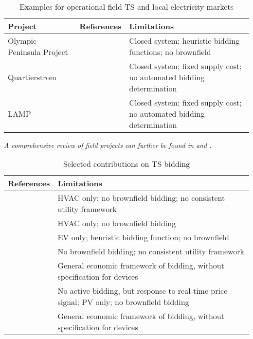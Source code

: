 \begin{table}[t]
\centering
\caption{Examples for operational field TS and local electricity markets}
\label{tab:existing_contributions}
\begin{tabular}{p{4cm}|p{5cm}|p{5cm}}
\textbf{Project} & \textbf{References} & \textbf{Limitations}                   \\ \hline
 Olympic Peninsula Project & \cite{PNNL2006,hammerstrom_2008} & Closed system; heuristic bidding functions; no brownfield \\ \hline
Quartierstrom & \cite{Ableitner2020,Woerner2019} & Closed system; fixed supply cost; no automated bidding determination \\ \hline
LAMP & \cite{Mengelkamp2018} & Closed system; fixed supply cost; no automated bidding determination \\
\hline
\end{tabular}
{\textit{A comprehensive review of field projects can further be found in \cite{Weinhardt2019} and \cite{abrishambaf_towards_2019}.}}
\end{table}

\begin{table}[t]
\centering
\caption{Selected contributions on TS bidding}
\label{tab:existing_contributions_bidding}
\begin{tabular}{p{5cm}|p{9cm}}
 \textbf{References} & \textbf{Limitations}                   \\ \hline
 \cite{adhikari_simulation_2016} & HVAC only; no brownfield bidding; no consistent utility framework \\ \hline \cite{Arlt2020} & HVAC only; no brownfield bidding \\ \hline \cite{behboodi_electric_2016} & EV only; heuristic bidding function; no brownfield \\ \hline
 \cite{hammerstrom_2008} & No brownfield bidding; no consistent utility framework \\ \hline
 \citet{lian_transactive_2020} & General economic framework of bidding, without specification for devices \\ \hline
 \cite{sajjadi_transactive_2016} & No active bidding, but response to real-time price signal; PV only; no brownfield bidding \\ \hline
 \cite{widergren_transactive_2017} & General economic framework of bidding, without specification for devices \\ \hline
\end{tabular}
\end{table}